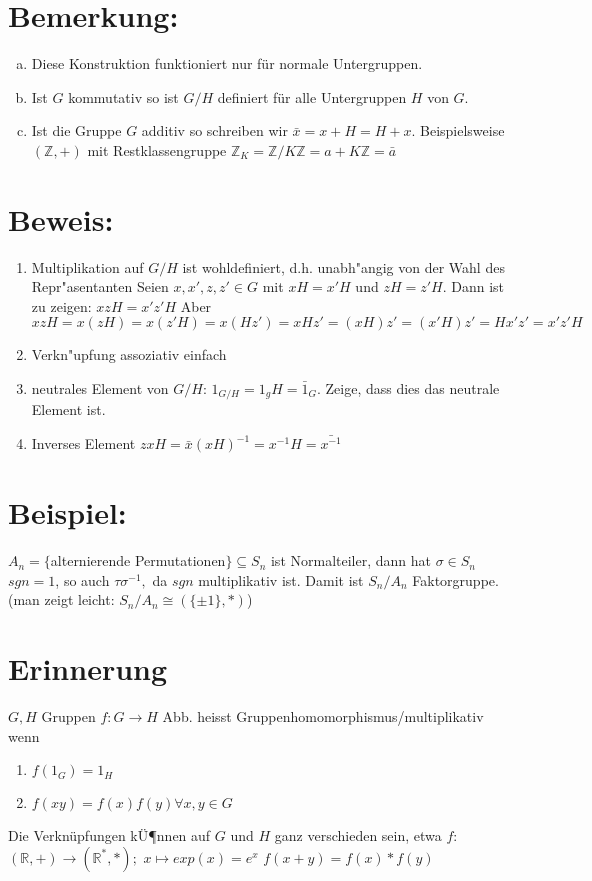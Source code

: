 \documentclass[12pt,a4paper,ngerman]{scrreprt}
\begin{document}
\section{Bemerkung:}
\begin{enumerate}[(a)]
\item Diese Konstruktion funktioniert nur für normale Untergruppen.
\item Ist $G$ kommutativ so ist $G/H$ definiert für alle Untergruppen $H$ von $G$.
\item Ist die Gruppe $G$ additiv so schreiben wir $\bar{x} = x+H = H+x$. 
Beispielsweise $(\mathbb{Z}, +)$ mit Restklassengruppe $\mathbb{Z}_K = \mathbb{Z} / K \mathbb{Z} = a+K\mathbb{Z} = \bar{a}$
\end{enumerate}

\section{Beweis:}
\begin{enumerate}[(1)]
\item Multiplikation auf $G/H$ ist wohldefiniert, d.h. unabh"angig von der Wahl des Repr"asentanten
Seien $x,x',z,z' \in G$ mit $xH=x'H$ und $zH=z'H$. Dann ist zu zeigen: $xzH = x'z'H$ Aber $xzH = x(zH) = x(z'H) = x(Hz') = xHz' = (xH)z' = (x'H)z' = Hx'z' = x'z'H$
\item Verkn"upfung assoziativ einfach
\item neutrales Element von $G/H$: $1_{G/H}= 1_gH =\bar{1}_G$. Zeige, dass dies das neutrale Element ist.
\item Inverses Element $zxH=\bar{x} (xH)^{-1} = x^{-1}H=\bar{x^{-1}}$ %
\end{enumerate}

\section{Beispiel:}
$A_n = \{$alternierende Permutationen$\} \subseteq S_n$ ist Normalteiler, dann hat $\sigma \in S_n$ $sgn=1$, so auch $\tau \sigma^{-1},$ da $sgn$ multiplikativ ist.
Damit ist $S_n/A_n$ Faktorgruppe.  (man zeigt leicht: $S_n/A_n \cong (\{\pm 1\},*)$)

\section{Erinnerung}
$G,H$ Gruppen $f: G\to H$ Abb. heisst Gruppenhomomorphismus/multiplikativ wenn
\begin{enumerate}[({GH}1)]
\item $f(1_G) = 1_H$
\item $f(xy) = f(x)f(y) \forall x,y \in G$
\end{enumerate}
Die Verknüpfungen kÜ¶nnen auf $G$ und $H$ ganz verschieden sein, etwa 
$f:$ \mbox{$(\mathbb{R},+) \to (\mathbb{R}^*,*);$} \mbox{$x \mapsto exp(x) = e^x$} $f(x+y) = f(x) * f(y)$
\end{document}
